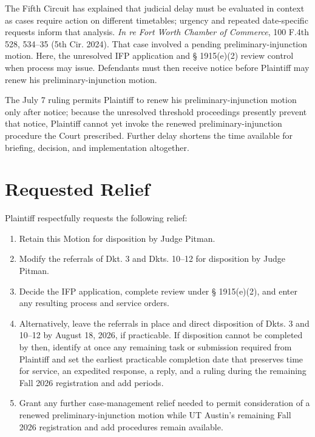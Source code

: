 \documentclass[12pt]{article}
\begin{document}
The Fifth Circuit has explained that judicial delay must be evaluated in context as cases require action on different timetables; urgency and repeated date-specific requests inform that analysis. \textit{In re Fort Worth Chamber of Commerce}, 100 F.4th 528, 534--35 (5th Cir. 2024). That case involved a pending preliminary-injunction motion. Here, the unresolved IFP application and § 1915(e)(2) review control when process may issue. Defendants must then receive notice before Plaintiff may renew his preliminary-injunction motion.

The July 7 ruling permits Plaintiff to renew his preliminary-injunction motion only after notice; because the unresolved threshold proceedings presently prevent that notice, Plaintiff cannot yet invoke the renewed preliminary-injunction procedure the Court prescribed. Further delay shortens the time available for briefing, decision, and implementation altogether.

\section*{Requested Relief}

Plaintiff respectfully requests the following relief:

\begin{enumerate}[label=\Alph*.,leftmargin=0.52in,itemsep=0pt]
\item Retain this Motion for disposition by Judge Pitman.
\item Modify the referrals of Dkt. 3 and Dkts. 10--12 for disposition by Judge Pitman.
\item Decide the IFP application, complete review under § 1915(e)(2), and enter any resulting process and service orders.
\item Alternatively, leave the referrals in place and direct disposition of Dkts. 3 and 10--12 by August 18, 2026, if practicable. If disposition cannot be completed by then, identify at once any remaining task or submission required from Plaintiff and set the earliest practicable completion date that preserves time for service, an expedited response, a reply, and a ruling during the remaining Fall 2026 registration and add periods.
\item Grant any further case-management relief needed to permit consideration of a renewed preliminary-injunction motion while UT Austin's remaining Fall 2026 registration and add procedures remain available.
\end{enumerate}
\end{document}
